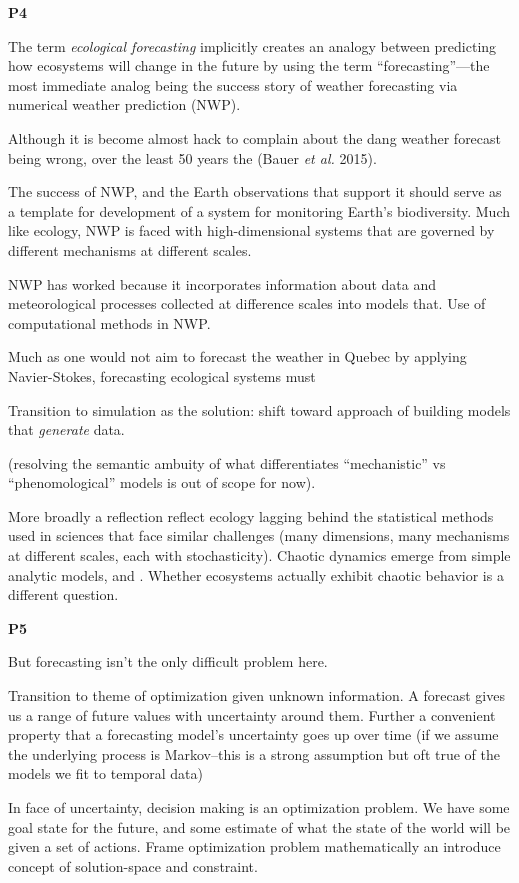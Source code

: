 \documentclass[11pt]{article}
\begin{document}
\textbf{P4}

The term \emph{ecological forecasting} implicitly creates an analogy
between predicting how ecosystems will change in the future by using the
term ``forecasting''---the most immediate analog being the success story
of weather forecasting via numerical weather prediction (NWP).

Although it is become almost hack to complain about the dang weather
forecast being wrong, over the least 50 years the (Bauer \emph{et al.}
2015).

The success of NWP, and the Earth observations that support it should
serve as a template for development of a system for monitoring Earth's
biodiversity. Much like ecology, NWP is faced with high-dimensional
systems that are governed by different mechanisms at different scales.

NWP has worked because it incorporates information about data and
meteorological processes collected at difference scales into models
that. Use of computational methods in NWP.

Much as one would not aim to forecast the weather in Quebec by applying
Navier-Stokes, forecasting ecological systems must

Transition to simulation as the solution: shift toward approach of
building models that \emph{generate} data.

(resolving the semantic ambuity of what differentiates ``mechanistic''
vs ``phenomological'' models is out of scope for now).

More broadly a reflection reflect ecology lagging behind the statistical
methods used in sciences that face similar challenges (many dimensions,
many mechanisms at different scales, each with stochasticity). Chaotic
dynamics emerge from simple analytic models, and . Whether ecosystems
actually exhibit chaotic behavior is a different question.

\textbf{P5}

But forecasting isn't the only difficult problem here.

Transition to theme of optimization given unknown information. A
forecast gives us a range of future values with uncertainty around them.
Further a convenient property that a forecasting model's uncertainty
goes up over time (if we assume the underlying process is Markov--this
is a strong assumption but oft true of the models we fit to temporal
data)

In face of uncertainty, decision making is an optimization problem. We
have some goal state for the future, and some estimate of what the state
of the world will be given a set of actions. Frame optimization problem
mathematically an introduce concept of solution-space and constraint.
\end{document}
